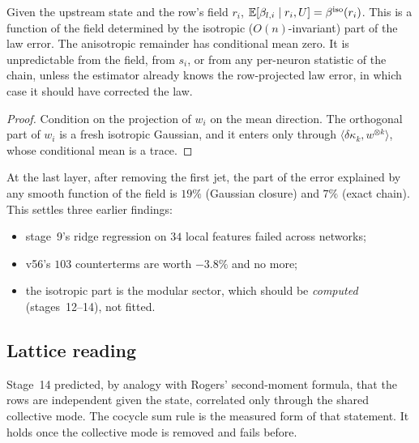 \begin{corollary}\label{cor:nofreelunch}
Given the upstream state and the row's field $r_i$, $\mathbb E[\beta_{l,i}\mid r_i,U]=\beta^{\rm iso}(r_i)$. This is a function of the field
determined by the isotropic ($O(n)$-invariant) part of the law error. The anisotropic remainder has conditional mean zero. It is
unpredictable from the field, from $s_i$, or from any per-neuron statistic of the chain, unless the estimator already knows the
row-projected law error, in which case it should have corrected the law.
\end{corollary}
\begin{proof}
Condition on the projection of $w_i$ on the mean direction. The orthogonal part of $w_i$ is a fresh isotropic Gaussian, and it enters
only through $\langle\delta\kappa_k,w^{\otimes k}\rangle$, whose conditional mean is a trace.
\end{proof}
At the last layer, after removing the first jet, the part of the error explained by any smooth function of the field is $19\%$ (Gaussian
closure) and $7\%$ (exact chain). This settles three earlier findings:
\begin{itemize}[leftmargin=*]
\item stage~9's ridge regression on $34$ local features failed across networks;
\item v56's $103$ counterterms are worth $-3.8\%$ and no more;
\item the isotropic part is the modular sector, which should be \emph{computed} (stages~12--14), not fitted.
\end{itemize}

\subsection{Lattice reading}
Stage~14 predicted, by analogy with Rogers' second-moment formula, that the rows are independent given the state, correlated only through
the shared collective mode. The cocycle sum rule is the measured form of that statement. It holds once the collective mode is removed
and fails before.
